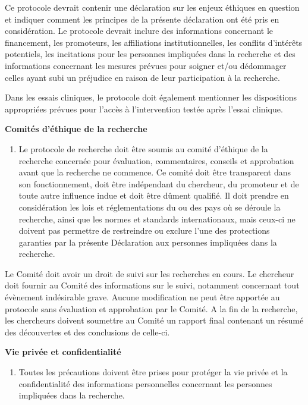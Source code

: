 \documentclass[
  12pt,
]{book}
\providecommand{\tightlist}{%
  \setlength{\itemsep}{0pt}\setlength{\parskip}{0pt}}
\begin{document}
Ce protocole devrait contenir une déclaration sur les enjeux éthiques en question et indiquer comment les principes de la présente déclaration ont été pris en considération. Le protocole devrait inclure des informations concernant le financement, les promoteurs, les affiliations institutionnelles, les conflits d'intérêts potentiels, les incitations pour les personnes impliquées dans la recherche et des informations concernant les mesures prévues pour soigner et/ou dédommager celles ayant subi un préjudice en raison de leur participation à la recherche.

Dans les essais cliniques, le protocole doit également mentionner les dispositions appropriées prévues pour l'accès à l'intervention testée après l'essai clinique.

\textbf{Comités d'éthique de la recherche}

\begin{enumerate}
\def\labelenumi{\arabic{enumi}.}
\setcounter{enumi}{22}
\tightlist
\item
  Le protocole de recherche doit être soumis au comité d'éthique de la recherche concernée pour évaluation, commentaires, conseils et approbation avant que la recherche ne commence. Ce comité doit être transparent dans son fonctionnement, doit être indépendant du chercheur, du promoteur et de toute autre influence indue et doit être dûment qualifié. Il doit prendre en considération les lois et réglementations du ou des pays où se déroule la recherche, ainsi que les normes et standards internationaux, mais ceux-ci ne doivent pas permettre de restreindre ou exclure l'une des protections garanties par la présente Déclaration aux personnes impliquées dans la recherche.
\end{enumerate}

Le Comité doit avoir un droit de suivi sur les recherches en cours. Le chercheur doit fournir au Comité des informations sur le suivi, notamment concernant tout évènement indésirable grave. Aucune modification ne peut être apportée au protocole sans évaluation et approbation par le Comité. A la fin de la recherche, les chercheurs doivent soumettre au Comité un rapport final contenant un résumé des découvertes et des conclusions de celle-ci.

\textbf{Vie privée et confidentialité}

\begin{enumerate}
\def\labelenumi{\arabic{enumi}.}
\setcounter{enumi}{23}
\tightlist
\item
  Toutes les précautions doivent être prises pour protéger la vie privée et la confidentialité des informations personnelles concernant les personnes impliquées dans la recherche.
\end{enumerate}
\end{document}

